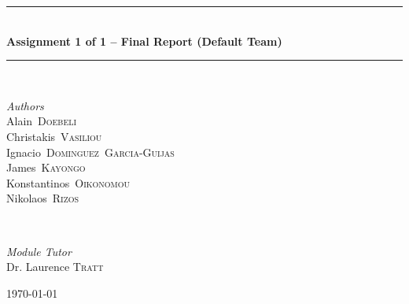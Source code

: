 \documentclass[11pt]{article}
\begin{document}
\begin{titlepage}
	\rule{\linewidth}{0.5mm} \\[4mm]
	{\Large \bfseries Assignment 1 of 1 -- Final Report (Default Team)} \\
	\rule{\linewidth}{0.5mm} \\[8mm]
	\begin{minipage}[t]{0.5\textwidth}
		\begin{flushleft}
			\large
			\textit{Authors} \\
			\mbox{Alain \textsc{Doebeli}} \\ %
			\mbox{Christakis \textsc{Vasiliou}} \\ %
			\mbox{Ignacio \textsc{Dominguez Garcia-Guijas}} \\ %
			\mbox{James \textsc{Kayongo}} \\ %
			\mbox{Konstantinos \textsc{Oikonomou}} \\ %
			\mbox{Nikolaos \textsc{Rizos}} \\ %
		\end{flushleft}
	\end{minipage}
	~
	\begin{minipage}[t]{0.4\textwidth}
		\begin{flushright}
			\large
			\textit{Module Tutor} \\
			Dr. Laurence \textsc{Tratt}
		\end{flushright}
	\end{minipage}
	
	\vspace*{\fill}
	\hspace{0pt}
	
	{\large{\today}} %
	
	\vspace*{\fill}
	\hspace{0pt}
	
\end{titlepage}


\tableofcontents


\newpage
\end{document}

